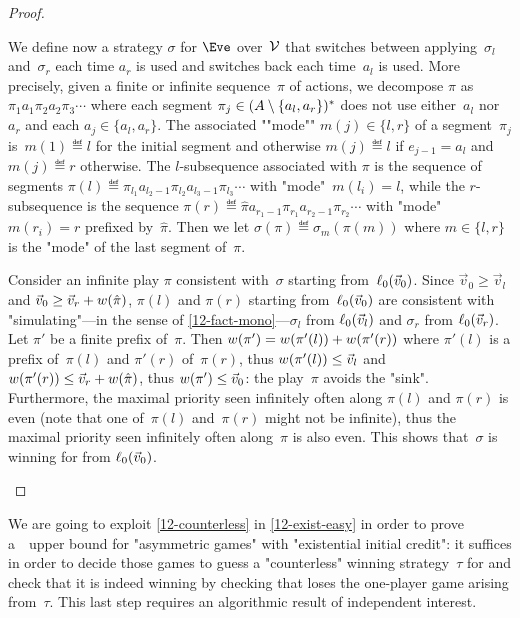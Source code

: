 \begin{proof}
  \begin{scope}
    We define now a strategy $\sigma$ for $\Eve$ over~$\mathcal V$ that
    switches between applying~$\sigma_l$ and~$\sigma_r$ each time
    $a_r$ is used and switches back each time~$a_l$ is used.  More
    precisely, given a finite or infinite sequence~$\pi$ of actions,
    we decompose $\pi$ as $\pi_1 a_1 \pi_2 a_2 \pi_3\cdots$ where each
    segment $\pi_j\in(A\setminus\{a_l,a_r\})^\ast$ does not use
    either~$a_l$ nor~$a_r$ and each $a_j\in\{a_l,a_r\}$.  The
    associated ""mode"" $m(j)\in\{l,r\}$ of a segment~$\pi_j$
    is~$m(1)\eqdef l$ for the initial segment and otherwise
    $m(j)\eqdef l$ if $e_{j-1}=a_l$ and $m(j)\eqdef r$ otherwise.  The
    $l$-subsequence associated with $\pi$ is the sequence of segments
    $\pi(l)\eqdef\pi_{l_1}a_{l_2-1}\pi_{l_2}a_{l_3-1}\pi_{l_3}\cdots$
    with "mode"~$m(l_i)=l$, while the $r$-subsequence is the sequence
    $\pi(r)\eqdef\hat\pi a_{r_1-1}\pi_{r_1}a_{r_2-1}\pi_{r_2}\cdots$
    with "mode"~$m(r_i)=r$ prefixed by~$\hat\pi$.  Then we let
    $\sigma(\pi)\eqdef\sigma_{m}(\pi(m))$ where $m\in\{l,r\}$ is the
    "mode" of the last segment of~$\pi$.

    Consider an infinite play $\pi$ consistent with~$\sigma$ starting
    from~$\ell_0(\vec v_0)$.  Since $\vec v_0\geq\vec v_l$ and
    $\vec v_0\geq \vec v_r+w(\hat\pi)$, $\pi(l)$ and $\pi(r)$
    starting from~$\ell_0(\vec v_0)$ are consistent with
    "simulating"---in the sense of \cref{12-fact-mono}---$\sigma_l$
    from $\ell_0(\vec v_l)$ and $\sigma_r$ from $\ell_0(\vec v_r)$.
    Let $\pi'$ be a finite prefix of~$\pi$.  Then
    $w(\pi')=w(\pi'(l))+w(\pi'(r))$ where $\pi'(l)$
    is a prefix of~$\pi(l)$ and $\pi'(r)$ of~$\pi(r)$, thus
    $w(\pi'(l))\leq\vec v_l$ and
    $w(\pi'(r))\leq\vec v_r+w(\hat\pi)$, thus
    $w(\pi')\leq\vec v_0$: the play~$\pi$ avoids the "sink".
    Furthermore, the maximal priority seen infinitely often along
    $\pi(l)$ and $\pi(r)$ is even (note that one of~$\pi(l)$
    and~$\pi(r)$ might not be infinite), thus the maximal priority
    seen infinitely often along~$\pi$ is also even.  This shows
    that~$\sigma$ is winning for \Eve from $\ell_0(\vec v_0)$.
  \end{scope}
\end{proof}

We are going to exploit \cref{12-counterless} in \cref{12-exist-easy}
in order to prove a~\coNP\ upper bound for "asymmetric games" with
"existential initial credit": it suffices in order to decide those
games to guess a "counterless" winning strategy~$\tau$ for \Adam and
check that it is indeed winning by checking that \Eve loses the
one-player game arising from~$\tau$.  This last step requires an
algorithmic result of independent interest.

